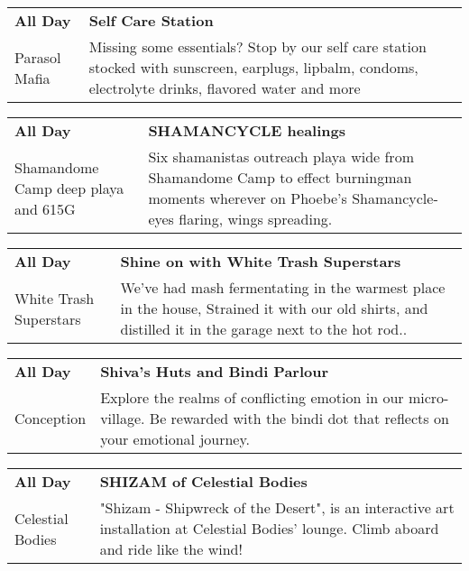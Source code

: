 \begin{tabular}{ p{1in} p{2.2in} }
    \textbf{All Day} & \textbf{Self Care Station} \\
    Parasol Mafia \newline  & Missing some essentials? Stop by our self care station stocked with sunscreen, earplugs, lipbalm, condoms, electrolyte drinks, flavored water and more \\
    \hline 
\end{tabular}
    
\begin{tabular}{ p{1in} p{2.2in} }
    \textbf{All Day} & \textbf{SHAMANCYCLE healings} \\
    Shamandome Camp \newline deep playa and 615G & Six shamanistas outreach playa wide from Shamandome Camp to effect burningman moments wherever on Phoebe's Shamancycle- eyes flaring, wings spreading. \\
    \hline 
\end{tabular}
    
\begin{tabular}{ p{1in} p{2.2in} }
    \textbf{All Day} & \textbf{Shine on with White Trash Superstars} \\
    White Trash Superstars \newline  & We've had mash fermentating in the warmest place in the house, Strained it with our old shirts, and distilled it in the garage next to the hot rod.. \\
    \hline 
\end{tabular}
    
\begin{tabular}{ p{1in} p{2.2in} }
    \textbf{All Day} & \textbf{Shiva's Huts and Bindi Parlour} \\
    Conception \newline  & Explore the realms of conflicting emotion in our micro-village.  Be rewarded with the bindi dot that reflects on your emotional journey. \\
    \hline 
\end{tabular}
    
\begin{tabular}{ p{1in} p{2.2in} }
    \textbf{All Day} & \textbf{SHIZAM of Celestial Bodies} \\
    Celestial Bodies \newline  & "Shizam - Shipwreck of the Desert", is an interactive art installation at Celestial Bodies' lounge. Climb aboard and ride like the wind! \\
    \hline 
\end{tabular}
    
